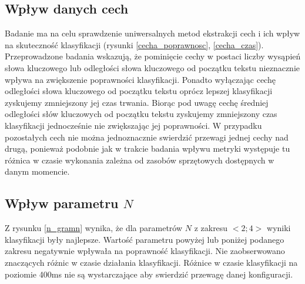 \documentclass{classrep}
\begin{document}
\subsection{Wpływ danych cech}
Badanie ma na celu sprawdzenie uniwersalnych metod ekstrakcji cech i ich wpływ na skuteczność
klasyfikacji (rysunki \ref{cecha_poprawnosc}, \ref{cecha_czas}). Przeprowadzone badania wskazują,
że pominięcie cechy w postaci liczby wysąpień słowa kluczowego lub odległości słowa kluczowego od początku tekstu
nieznacznie wpływa na zwiększenie poprawności klasyfikacji. Ponadto wyłączając cechę odległości słowa
kluczowego od początku tekstu oprócz lepszej klasyfikacji zyskujemy zmniejszony jej czas trwania.
Biorąc pod uwagę cechę średniej odległości słów kluczowych od początku tekstu zyskujemy zmniejszony
czas klasyfikacji jednocześnie nie zwiększając jej poprawności. W przypadku pozostałych cech nie można
jednoznacznie swierdzić przewagi jednej cechy nad drugą, ponieważ podobnie jak w trakcie badania wpływu
metryki występuje tu różnica w czasie wykonania zależna od zasobów sprzętowych dostępnych w danym momencie.

\subsection{Wpływ parametru $N$}
Z rysunku \ref{n_gramn} wynika, że dla parametrów $N$ z zakresu $<2;4>$ wyniki klasyfikacji były najlepsze.
Wartość parametru powyżej lub poniżej podanego zakresu negatywnie wpływała na poprawność klasyfikacji.
Nie zaobserwowano znaczących różnic w czasie działania klasyfikacji. Różnice w czasie klasyfikacji
na poziomie 400ms nie są wystarczające aby swierdzić przewagę danej konfiguracji.
\end{document}
